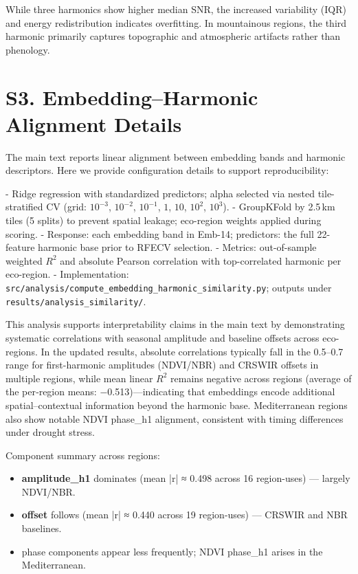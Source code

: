 \documentclass[utf8]{frontiers_suppmat}
\begin{document}
While three harmonics show higher median SNR, the increased variability (IQR) and energy redistribution indicates overfitting. In mountainous regions, the third harmonic primarily captures topographic and atmospheric artifacts rather than phenology.

\section{S3. Embedding–Harmonic Alignment Details}

The main text reports linear alignment between embedding bands and harmonic descriptors. Here we provide configuration details to support reproducibility:

- Ridge regression with standardized predictors; alpha selected via nested tile-stratified CV (grid: $10^{-3}$, $10^{-2}$, $10^{-1}$, $1$, $10$, $10^2$, $10^3$).
- GroupKFold by 2.5\,km tiles (5 splits) to prevent spatial leakage; eco-region weights applied during scoring.
- Response: each embedding band in Emb-14; predictors: the full 22-feature harmonic base prior to RFECV selection.
- Metrics: out-of-sample weighted $R^2$ and absolute Pearson correlation with top-correlated harmonic per eco-region.
- Implementation: \texttt{src/analysis/compute\_embedding\_harmonic\_similarity.py}; outputs under \texttt{results/analysis\_similarity/}.

This analysis supports interpretability claims in the main text by demonstrating systematic correlations with seasonal amplitude and baseline offsets across eco-regions. In the updated results, absolute correlations typically fall in the 0.5–0.7 range for first-harmonic amplitudes (NDVI/NBR) and CRSWIR offsets in multiple regions, while mean linear $R^2$ remains negative across regions (average of the per‑region means: −0.513)—indicating that embeddings encode additional spatial–contextual information beyond the harmonic base. Mediterranean regions also show notable NDVI phase\_h1 alignment, consistent with timing differences under drought stress.

Component summary across regions:
\begin{itemize}
  \item \textbf{amplitude\_h1} dominates (mean |r| ≈ 0.498 across 16 region-uses) — largely NDVI/NBR.
  \item \textbf{offset} follows (mean |r| ≈ 0.440 across 19 region-uses) — CRSWIR and NBR baselines.
  \item phase components appear less frequently; NDVI phase\_h1 arises in the Mediterranean.
\end{itemize}
\end{document}
